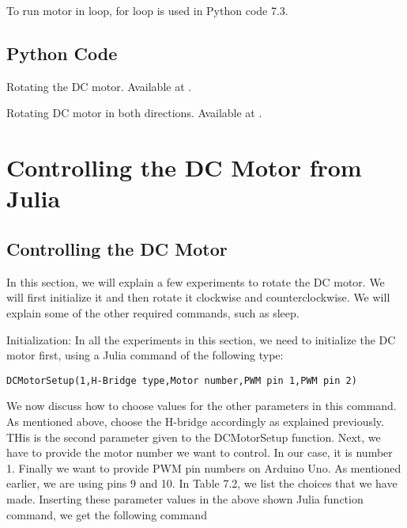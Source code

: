 To run motor in loop, for loop is used in Python code 7.3.

\subsection{Python Code}
\label{sec:dcmotor-python-code}

\begin{pycode}
{Rotating the DC motor.  Available at
  .}
\label{py:dcmotor-clock}

\end{pycode}

\begin{pycode}
{Rotating DC motor in both directions.  Available at
  .}
\label{py:dcmotor-both}

\end{pycode}

\begin{pycode}
\label{py:dcmotor-loop}

\end{pycode}

\section{Controlling the DC Motor from Julia}
\subsection{Controlling the DC Motor}

In this section, we will explain a few experiments to rotate the DC
motor. We will first initialize it and then rotate it clockwise and
counterclockwise. We will explain some of the other required commands,
such as sleep.

Initialization: In all the experiments in this section, we need to
initialize the DC motor first, using a Julia command of the following
type:
\begin{lstlisting}[style=nonumbers]
  DCMotorSetup(1,H-Bridge type,Motor number,PWM pin 1,PWM pin 2)
\end{lstlisting}


We now discuss how to choose values for the other parameters in this
command. As mentioned above, choose the H-bridge accordingly as
explained previously. THis is the second parameter given to the
DCMotorSetup function. Next, we have to provide the motor number we
want to control. In our case, it is number 1. Finally we want to
provide PWM pin numbers on Arduino Uno. As mentioned earlier, we are
using pins 9 and 10. In Table 7.2, we list the choices that we have
made. Inserting these parameter values in the above shown Julia
function command, we get the following command

